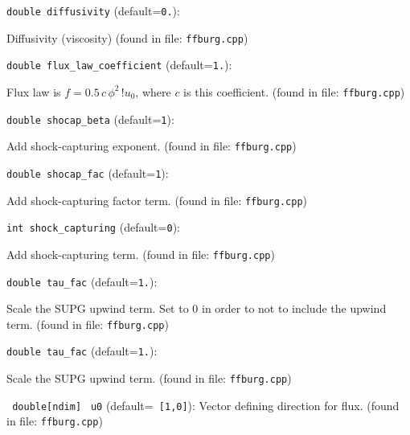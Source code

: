 \item\verb+double diffusivity+ {\rm(default=\verb|0.|)}:

Diffusivity (viscosity)
 (found in file: \verb+ffburg.cpp+)
\item\verb+double flux_law_coefficient+ {\rm(default=\verb|1.|)}:

Flux law is $f= 0.5\,c\, \phi^2\,!u_0$, where $c$
is this coefficient. 
 (found in file: \verb+ffburg.cpp+)
\item\verb+double shocap_beta+ {\rm(default=\verb|1|)}:

Add shock-capturing exponent.
 (found in file: \verb+ffburg.cpp+)
\item\verb+double shocap_fac+ {\rm(default=\verb|1|)}:

Add shock-capturing factor term.
 (found in file: \verb+ffburg.cpp+)
\item\verb+int shock_capturing+ {\rm(default=\verb|0|)}:

Add shock-capturing term.
 (found in file: \verb+ffburg.cpp+)
\item\verb+double tau_fac+ {\rm(default=\verb|1.|)}:

Scale the SUPG upwind term. Set to 0 in order to
 not to include the upwind term. 
 (found in file: \verb+ffburg.cpp+)
\item\verb+double tau_fac+ {\rm(default=\verb|1.|)}:

Scale the SUPG upwind term. 
 (found in file: \verb+ffburg.cpp+)
\item\verb+ double[ndim]+ \verb+ u0+ {\rm(default=\verb| [1,0]|)}:
 Vector defining direction for flux. 
 (found in file: \verb+ffburg.cpp+)

